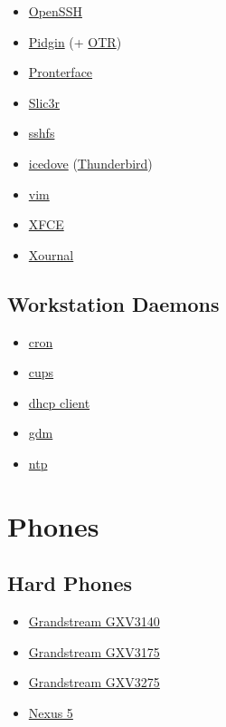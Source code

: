 \begin{itemize}
\item \href{http://www.openssh.com/}{OpenSSH}
\item \href{http://www.pidgin.im/}{Pidgin} (+ \href{https://otr.cypherpunks.ca/}{OTR})
\item \href{https://github.com/kliment/Printrun}{Pronterface}
\item \href{http://slic3r.org/}{Slic3r}
\item \href{http://fuse.sourceforge.net/sshfs.html}{sshfs}
\item \href{https://wiki.debian.org/Icedove}{icedove} (\href{http://www.mozilla.org/en-US/thunderbird/}{Thunderbird})
\item \href{http://www.vim.org/}{vim}
\item \href{http://www.xfce.org/}{XFCE}
\item \href{http://xournal.sourceforge.net/}{Xournal}
\end{itemize}

\subsection{Workstation Daemons}
\begin{itemize}
\item \href{http://ftp.isc.org/isc/cron/}{cron}
\item \href{http://www.cups.org/}{cups}
\item \href{http://www.isc.org/}{dhcp client}
\item \href{https://wiki.gnome.org/Projects/GDM}{gdm}
\item \href{http://support.ntp.org/}{ntp}
\end{itemize}

\section{Phones}
\subsection{Hard Phones}
\begin{itemize}
\item \href{https://www.grandstream.com/products/ip-video-telephony/gxv3140/}{Grandstream GXV3140}
\item \href{https://www.grandstream.com/products/ip-video-telephony/gxv3175/}{Grandstream GXV3175}
\item \href{https://www.grandstream.com/products/ip-video-telephony/gxv3275/}{Grandstream GXV3275}
\item \href{http://www.google.com/nexus/5/}{Nexus 5}
\end{itemize}


